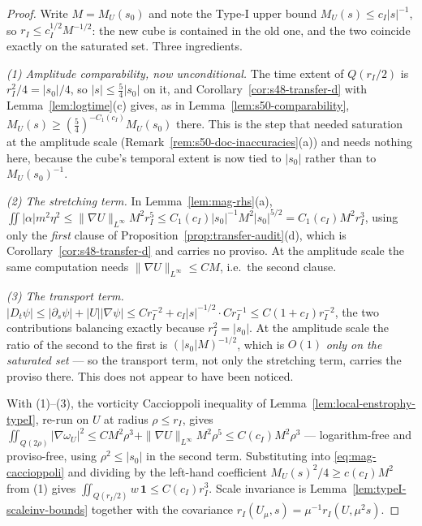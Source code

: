 \documentclass[11pt]{article}
\theoremstyle{definition}
\theoremstyle{remark}
\begin{document}
\begin{proof}
  Write $M=M_U(s_0)$ and note the Type-I upper bound
  $M_U(s)\leq c_I|s|^{-1}$, so $r_I\leq c_I^{1/2}M^{-1/2}$: the new cube is
  contained in the old one, and the two coincide exactly on the saturated set.
  Three ingredients.

  \emph{(1) Amplitude comparability, now unconditional.} The time extent of
  $Q(r_I/2)$ is $r_I^2/4=|s_0|/4$, so $|s|\leq\tfrac54|s_0|$ on it, and
  Corollary~\ref{cor:s48-transfer-d} with Lemma~\ref{lem:logtime}(c) gives, as
  in Lemma~\ref{lem:s50-comparability},
  $M_U(s)\geq(\tfrac54)^{-C_1(c_I)}M_U(s_0)$ there. This is the step that
  needed saturation at the amplitude scale
  (Remark~\ref{rem:s50-doc-inaccuracies}(a)) and needs nothing here, because
  the cube's temporal extent is now tied to $|s_0|$ rather than to
  $M_U(s_0)^{-1}$.

  \emph{(2) The stretching term.} In Lemma~\ref{lem:mag-rhs}(a),
  $\iint|\alpha|m^2\eta^2\leq\|\nabla U\|_{L^\infty}M^2r_I^5
  \leq C_1(c_I)|s_0|^{-1}M^2|s_0|^{5/2}=C_1(c_I)M^2r_I^3$,
  using only the \emph{first} clause of
  Proposition~\ref{prop:transfer-audit}(d), which is
  Corollary~\ref{cor:s48-transfer-d} and carries no proviso. At the amplitude
  scale the same computation needs $\|\nabla U\|_{L^\infty}\leq CM$, i.e.\ the
  second clause.

  \emph{(3) The transport term.} $|D_t\psi|\leq|\partial_s\psi|+|U||\nabla\psi|
  \leq Cr_I^{-2}+c_I|s|^{-1/2}\cdot Cr_I^{-1}\leq C(1+c_I)r_I^{-2}$, the two
  contributions balancing exactly because $r_I^2=|s_0|$. At the amplitude
  scale the ratio of the second to the first is $(|s_0|M)^{-1/2}$, which is
  $O(1)$ \emph{only on the saturated set} --- so the transport term, not only
  the stretching term, carries the proviso there. This does not appear to have
  been noticed.

  With (1)--(3), the vorticity Caccioppoli inequality of
  Lemma~\ref{lem:local-enstrophy-typeI}, re-run on $U$ at radius
  $\rho\leq r_I$, gives
  $\iint_{Q(2\rho)}|\nabla\omega_U|^2\leq CM^2\rho^3
  +\|\nabla U\|_{L^\infty}M^2\rho^5\leq C(c_I)M^2\rho^3$
  --- logarithm-free and proviso-free, using $\rho^2\leq|s_0|$ in the second
  term. Substituting into \eqref{eq:mag-caccioppoli} and dividing by the
  left-hand coefficient $M_U(s)^2/4\geq c(c_I)M^2$ from (1) gives
  $\iint_{Q(r_I/2)}w\,\mathbf{1}\leq C(c_I)r_I^3$. Scale invariance is
  Lemma~\ref{lem:typeI-scaleinv-bounds} together with the covariance
  $r_I(U_\mu,s)=\mu^{-1}r_I(U,\mu^2s)$.
\end{proof}
\end{document}
